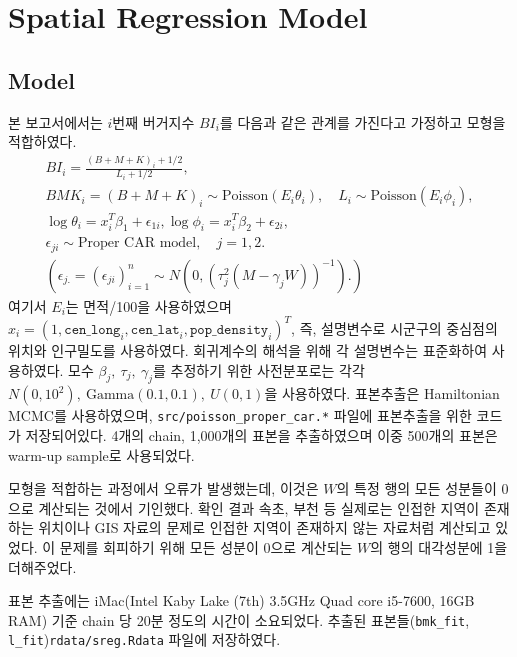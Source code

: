 \documentclass{scrartcl}
\begin{document}
\section{Spatial Regression Model}\label{sec:sreg}

\subsection{Model}\label{subsec:sreg:model}

본 보고서에서는 $i$번째 버거지수 $BI_i$를 다음과 같은 관계를 가진다고 가정하고 모형을 적합하였다.
\begin{equation}\label{eqn:sreg}
    \begin{gathered}
    BI_i = \frac{(B+M+K)_i+1/2}{L_i+1/2},\\
    BMK_i = (B+M+K)_i \sim \textrm{Poisson}(E_i \theta_i), \quad L_i \sim \textrm{Poisson}(E_i \phi_i), \\
    \log \theta_i = x_i^T \beta_1 + \epsilon_{1i}, \log \phi_i = x_i^T \beta_2 + \epsilon_{2i}, \\
    \epsilon_{ji} \sim \textrm{Proper CAR model}, \quad j=1,2. \\
    (\epsilon_{j.} = (\epsilon_{ji})_{i=1}^n \sim N(0,(\tau_j^2 (M-\gamma_j W))^{-1} ).)
    \end{gathered}
\end{equation}
여기서 $E_i$는 면적/100을 사용하였으며 $x_i = (1, \texttt{cen\_long}_i, \texttt{cen\_lat}_i, \texttt{pop\_density}_i)^T$, 즉, 설명변수로 시군구의 중심점의 위치와 인구밀도를 사용하였다. 회귀계수의 해석을 위해 각 설명변수는 표준화하여 사용하였다. 모수 $\beta_j,~\tau_j,~\gamma_j$를 추정하기 위한 사전분포로는 각각 $N(0, 10^2),~\textrm{Gamma}(0.1, 0.1),~U(0,1)$을 사용하였다. 표본추출은 Hamiltonian MCMC를 사용하였으며, \texttt{src/poisson\_proper\_car.*} 파일에 표본추출을 위한 코드가 저장되어있다. 4개의 chain, 1,000개의 표본을 추출하였으며 이중 500개의 표본은 warm-up sample로 사용되었다. 

모형을 적합하는 과정에서 오류가 발생했는데, 이것은 $W$의 특정 행의 모든 성분들이 0으로 계산되는 것에서 기인했다. 확인 결과 속초, 부천 등 실제로는 인접한 지역이 존재하는 위치이나 GIS 자료의 문제로 인접한 지역이 존재하지 않는 자료처럼 계산되고 있었다. 이 문제를 회피하기 위해 모든 성분이 0으로 계산되는 $W$의 행의 대각성분에 1을 더해주었다.

표본 추출에는 iMac(Intel Kaby Lake (7th) 3.5GHz Quad core i5-7600, 16GB RAM) 기준 chain 당 20분 정도의 시간이 소요되었다. 추출된 표본들(\texttt{bmk\_fit}, \texttt{l\_fit})\을 \texttt{rdata/sreg.Rdata} 파일에 저장하였다.
\end{document}
